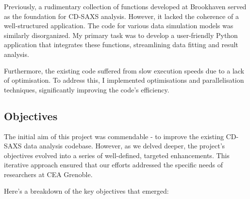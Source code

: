 \medskip

Previously, a rudimentary collection of functions developed at Brookhaven served as the 
foundation for CD-SAXS analysis. However, it lacked the coherence of a well-structured application.
The code for various data simulation models was similarly disorganized. My primary task was to 
develop a user-friendly Python application that integrates these functions, streamlining data 
fitting and result analysis.

\medskip

Furthermore, the existing code suffered from slow execution speeds due to a lack of optimisation.
To address this, I implemented optimisations and parallelisation techniques, significantly 
improving the code's efficiency.

\medskip


\subsection{Objectives}

\medskip

The initial aim of this project was commendable - to improve the existing CD-SAXS data analysis 
codebase. However, as we delved deeper, the project's objectives evolved into a series of 
well-defined, targeted enhancements. This iterative approach ensured that our efforts addressed 
the specific needs of researchers at CEA Grenoble.

Here's a breakdown of the key objectives that emerged:

